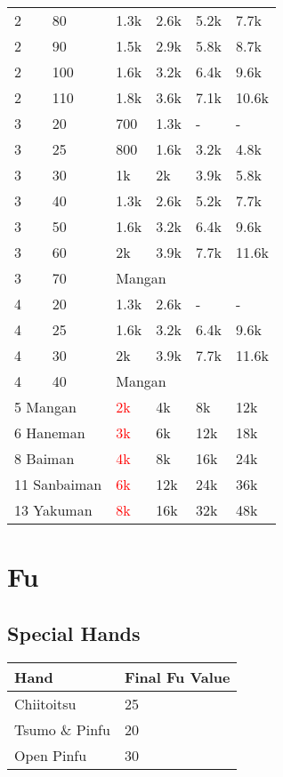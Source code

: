 \documentclass[8pt,a4paper]{extarticle}
\begin{document}
\begin{multicols*}{5}
\begin{tabularx}{\columnwidth}{llXXXX}
2 & 80 & 1.3k & 2.6k & 5.2k & 7.7k \\
2 & 90 & 1.5k & 2.9k & 5.8k & 8.7k \\
2 & 100 & 1.6k & 3.2k & 6.4k & 9.6k \\
2 & 110 & 1.8k & 3.6k & 7.1k & 10.6k \\
3 & 20 & 700 & 1.3k & - & - \\
3 & 25 & 800 & 1.6k & 3.2k & 4.8k \\
3 & 30 & 1k & 2k & 3.9k & 5.8k \\
3 & 40 & 1.3k & 2.6k & 5.2k & 7.7k \\
3 & 50 & 1.6k & 3.2k & 6.4k & 9.6k \\
3 & 60 & 2k & 3.9k & 7.7k & 11.6k \\
3 & 70 & \multicolumn{4}{l}{Mangan} \\
4 & 20 & 1.3k & 2.6k & - & - \\
4 & 25 & 1.6k & 3.2k & 6.4k & 9.6k \\
4 & 30 & 2k & 3.9k & 7.7k & 11.6k \\
4 & 40 & \multicolumn{4}{l}{Mangan} \\ \midrule
\multicolumn{2}{l}{5 Mangan} & \textcolor{red}{2k} & 4k & 8k & 12k \\
\multicolumn{2}{l}{6 Haneman} & \textcolor{red}{3k} & 6k & 12k & 18k \\
\multicolumn{2}{l}{8 Baiman} & \textcolor{red}{4k} & 8k & 16k & 24k \\
\multicolumn{2}{l}{11 Sanbaiman} & \textcolor{red}{6k} & 12k & 24k & 36k \\
\multicolumn{2}{l}{13 Yakuman} & \textcolor{red}{8k} & 16k & 32k & 48k \\ \bottomrule
\end{tabularx}
\smallbreak

\section*{Fu}
\subsection*{Special Hands}
\small
\begin{tabularx}{\columnwidth}{lX}
\toprule
Hand & Final Fu Value \\ \midrule
Chiitoitsu & 25 \\
Tsumo \& Pinfu & 20 \\
Open Pinfu & 30 \\ \bottomrule
\end{tabularx}


\end{multicols*}
\end{document}
